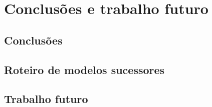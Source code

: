 
\chapter{Conclusões e trabalho futuro}
\label{cha:conclusoes}

\section{Conclusões}
\label{sec:conclusoes}



\section{Roteiro de modelos sucessores}
\label{sec:roteiro-modelos}



\section{Trabalho futuro}
\label{sec:trabalho-futuro}



